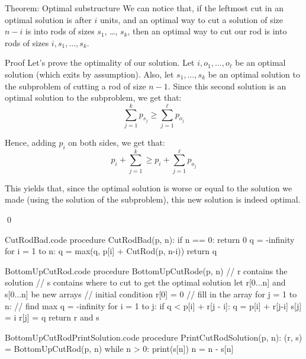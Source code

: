 \documentclass[a4paper]{article}
\begin{document}
\begin{parag}{Theorem: Optimal substructure}
    We can notice that, if the leftmost cut in an optimal solution is after $i$ units, and an optimal way to cut a solution of size $n-i$ is into rods of sizes $s_1$, \ldots, $s_k$, then an optimal way to cut our rod is into rods of sizes $i, s_1, \ldots, s_k$. 

    \begin{subparag}{Proof}
        Let's prove the optimality of our solution. Let $i, o_1, \ldots, o_\ell$ be an optimal solution (which exits by assumption). Also, let $s_1, \ldots, s_k$ be an optimal solution to the subproblem of cutting a rod of size $n-1$. Since this second solution is an optimal solution to the subproblem, we get that:
        \[\sum_{j=1}^{k} p_{s_j} \geq \sum_{j=1}^{\ell }  p_{o_j}\]
        
        Hence, adding $p_i$ on both sides, we get that: 
        \[p_i + \sum_{j=1}^{k} \geq p_i + \sum_{j=1}^{\ell } p_{o_j}\]
        
        This yields that, since the optimal solution is worse or equal to the solution we made (using the solution of the subproblem), this new solution is indeed optimal. 

        \qed
    \end{subparag}
\end{parag}

\begin{filecontents*}[overwrite]{CutRodBad.code}
procedure CutRodBad(p, n):
    if n == 0:
        return 0
    q = -infinity
    for i = 1 to n:
        q = max(q, p[i] + CutRod(p, n-i))
    return q
\end{filecontents*}

\begin{filecontents*}[overwrite]{BottomUpCutRod.code}
procedure BottomUpCutRode(p, n)
    // r contains the solution
    // s contains where to cut to get the optimal solution
    let r[0...n] and s[0...n] be new arrays
    // initial condition
    r[0] = 0
    // fill in the array
    for j = 1 to n:
        // find max
        q = -infinity
        for i = 1 to j:
            if q < p[i] + r[j - i]:
                q = p[i] + r[j-i]
                s[j] = i
        r[j] = q
    return r and s
\end{filecontents*}

\begin{filecontents*}[overwrite]{BottomUpCutRodPrintSolution.code}
procedure PrintCutRodSolution(p, n):
    (r, s) = BottomUpCutRod(p, n)
    while n > 0:
        print(s[n])
        n = n - s[n]
\end{filecontents*}
\end{document}
